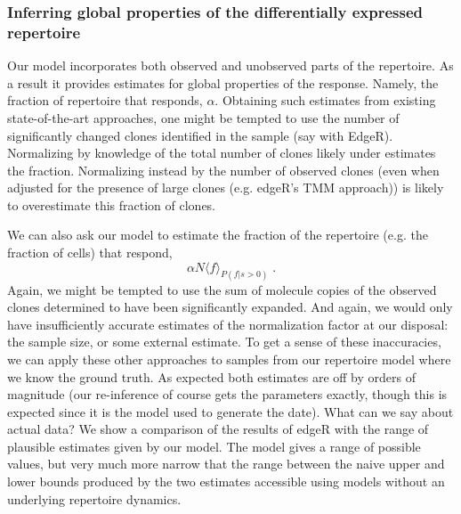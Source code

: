 \documentclass[letterpaper,english,prl,reprint,longbibliography]{revtex4-1} %
\begin{document}
\subsubsection*{Inferring global properties of the differentially expressed repertoire}
Our model incorporates both observed and unobserved parts of the repertoire. As a result it provides estimates for global properties of the response. Namely, the fraction of repertoire that responds, $\alpha$. Obtaining such estimates from existing state-of-the-art approaches, one might be tempted to use the number of significantly changed clones identified in the sample (say with EdgeR). Normalizing by knowledge of the total number of clones likely under estimates the fraction. Normalizing instead by the number of observed clones (even when adjusted for the presence of large clones (e.g. edgeR's TMM approach)) is likely to overestimate this fraction of clones.

We can also ask our model to estimate the fraction of the repertoire (e.g. the fraction of cells) that respond, 
\begin{equation}
	\alpha N \langle f\rangle_{P(f|s>0)}\;.
\end{equation}
Again, we might be tempted to use the sum of molecule copies of the observed clones determined to have been significantly expanded. And again, we would only have insufficiently accurate estimates of the normalization factor at our disposal: the sample size, or some external estimate.
To get a sense of these inaccuracies, we can apply these other approaches to samples from our repertoire model where we know the ground truth. As expected both estimates are off by orders of magnitude (our re-inference of course gets the parameters exactly, though this is expected since it is the model used to generate the date).
What can we say about actual data? We show a comparison of the results of edgeR with the range of plausible estimates given by our model. The model gives a range of possible values, but very much more narrow that the range between the naive upper and lower bounds produced by the two estimates accessible using models without an underlying repertoire dynamics.
\end{document}
